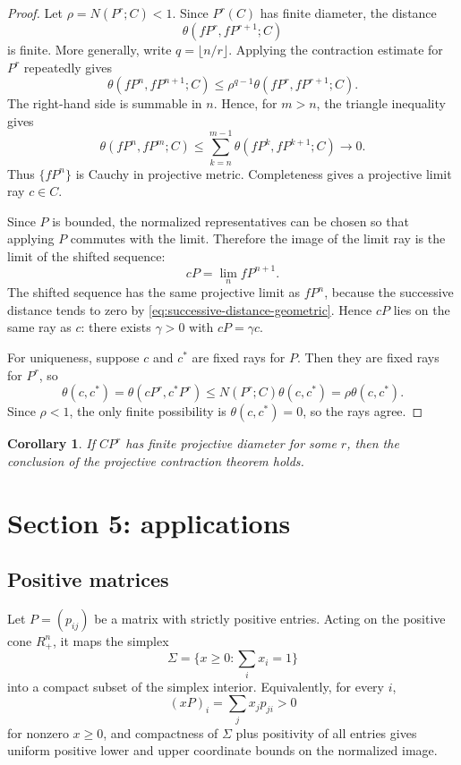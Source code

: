 \documentclass[11pt]{article}
\newtheorem{corollary}{Corollary}
\begin{document}
\begin{proof}
Let \(\rho=N(P^r;C)<1\).  Since \(P^r(C)\) has finite diameter, the distance
\[
  \theta(fP^r,fP^{r+1};C)
\]
is finite.  More generally, write \(q=\lfloor n/r\rfloor\).  Applying the contraction estimate for \(P^r\) repeatedly gives
\begin{equation}
  \theta(fP^n,fP^{n+1};C)
  \le \rho^{q-1}\theta(fP^r,fP^{r+1};C).
  \label{eq:successive-distance-geometric}
\end{equation}
The right-hand side is summable in \(n\).  Hence, for \(m>n\), the triangle inequality gives
\[
  \theta(fP^n,fP^m;C)
  \le \sum_{k=n}^{m-1}\theta(fP^k,fP^{k+1};C)\longrightarrow0.
\]
Thus \(\{fP^n\}\) is Cauchy in projective metric.  Completeness gives a projective limit ray \(c\in C\).

Since \(P\) is bounded, the normalized representatives can be chosen so that applying \(P\) commutes with the limit.  Therefore the image of the limit ray is the limit of the shifted sequence:
\[
  cP=\lim_n fP^{n+1}.
\]
The shifted sequence has the same projective limit as \(fP^n\), because the successive distance tends to zero by \eqref{eq:successive-distance-geometric}.  Hence \(cP\) lies on the same ray as \(c\): there exists \(\gamma>0\) with \(cP=\gamma c\).

For uniqueness, suppose \(c\) and \(c^*\) are fixed rays for \(P\).  Then they are fixed rays for \(P^r\), so
\[
  \theta(c,c^*)=\theta(cP^r,c^*P^r)
  \le N(P^r;C)\theta(c,c^*)
  =\rho\theta(c,c^*).
\]
Since \(\rho<1\), the only finite possibility is \(\theta(c,c^*)=0\), so the rays agree.
\end{proof}

\begin{corollary}
If \(C P^r\) has finite projective diameter for some \(r\), then the conclusion of the projective contraction theorem holds.
\end{corollary}

\section{Section 5: applications}

\subsection{Positive matrices}
Let \(P=(p_{ij})\) be a matrix with strictly positive entries.  Acting on the positive cone \(R_+^n\), it maps the simplex
\[
  \Sigma=\{x\ge0:\sum_i x_i=1\}
\]
into a compact subset of the simplex interior.  Equivalently, for every \(i\),
\[
  (xP)_i=\sum_j x_jp_{ji}>0
\]
for nonzero \(x\ge0\), and compactness of \(\Sigma\) plus positivity of all entries gives uniform positive lower and upper coordinate bounds on the normalized image.
\end{document}
